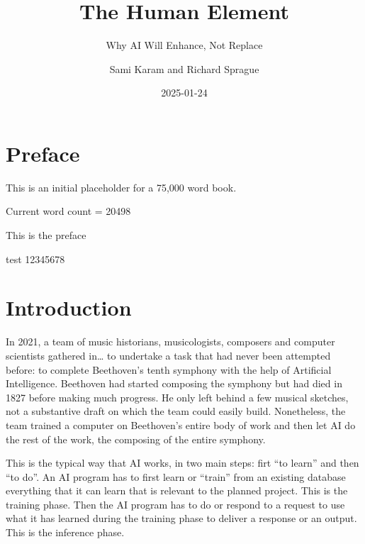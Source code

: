 \documentclass[
  Letterpaper,
]{scrbook}
\title{The Human Element}
\subtitle{Why AI Will Enhance, Not Replace}
\author{Sami Karam and Richard Sprague}
\date{2025-01-24}
\renewcommand*\contentsname{Table of contents}
\newcommand\contentsname{Table of contents}
\begin{document}
\frontmatter
\maketitle

\renewcommand*\contentsname{Table of contents}
{
\setcounter{tocdepth}{2}
\tableofcontents
}

\mainmatter
{}

\chapter*{Preface}\label{preface}


This is an initial placeholder for a 75,000 word book.

Current word count = 20498

This is the preface

test 12345678


\chapter*{Introduction}\label{introduction}


In 2021, a team of music historians, musicologists, composers and
computer scientists gathered in\ldots{} to undertake a task that had
never been attempted before: to complete Beethoven's tenth symphony with
the help of Artificial Intelligence. Beethoven had started composing the
symphony but had died in 1827 before making much progress. He only left
behind a few musical sketches, not a substantive draft on which the team
could easily build. Nonetheless, the team trained a computer on
Beethoven's entire body of work and then let AI do the rest of the work,
the composing of the entire symphony.

This is the typical way that AI works, in two main steps: firt ``to
learn'' and then ``to do''. An AI program has to first learn or
``train'' from an existing database everything that it can learn that is
relevant to the planned project. This is the training phase. Then the AI
program has to do or respond to a request to use what it has learned
during the training phase to deliver a response or an output. This is
the inference phase.
\end{document}
